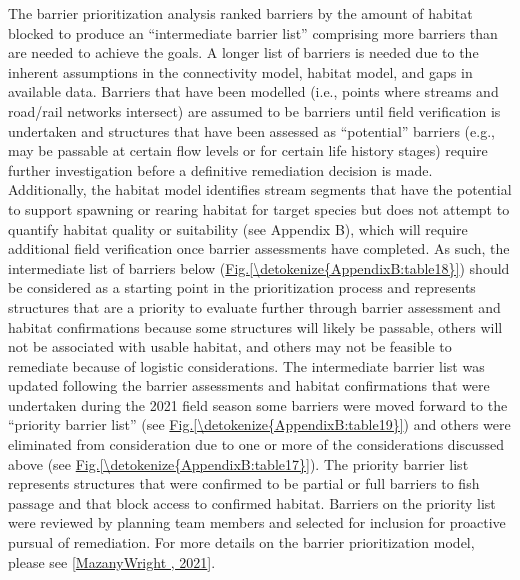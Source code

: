 \documentclass[letterpaper,10pt,english]{jupyterBook}
\begin{document}
\sphinxAtStartPar
The barrier prioritization analysis ranked barriers by the amount of habitat blocked to produce an “intermediate barrier list” comprising more barriers than are needed to achieve the goals. A longer list of barriers is needed due to the inherent assumptions in the connectivity model, habitat model, and gaps in available data. Barriers that have been modelled (i.e., points where streams and road/rail networks intersect) are assumed to be barriers until field verification is undertaken and structures that have been assessed as “potential” barriers (e.g., may be passable at certain flow levels or for certain life history stages) require further investigation before a definitive remediation decision is made. Additionally, the habitat model identifies stream segments that have the potential to support spawning or rearing habitat for target species but does not attempt to quantify habitat quality or suitability (see Appendix B), which will require additional field verification once barrier assessments have completed. As such, the intermediate list of barriers below (\hyperref[\detokenize{AppendixB:table18}]{Fig.\@ \ref{\detokenize{AppendixB:table18}}}) should be considered as a starting point in the prioritization process and represents structures that are a priority to evaluate further through barrier assessment and habitat confirmations because some structures will likely be passable, others will not be associated with usable habitat, and others may not be feasible to remediate because of logistic considerations. The intermediate barrier list was updated following the barrier assessments and habitat confirmations that were undertaken during the 2021 field season \sphinxhyphen{} some barriers were moved forward to the “priority barrier list” (see \hyperref[\detokenize{AppendixB:table19}]{Fig.\@ \ref{\detokenize{AppendixB:table19}}}) and others were eliminated from consideration due to one or more of the considerations discussed above (see \hyperref[\detokenize{AppendixB:table17}]{Fig.\@ \ref{\detokenize{AppendixB:table17}}}). The priority barrier list represents structures that were confirmed to be partial or full barriers to fish passage and that block access to confirmed habitat. Barriers on the priority list were reviewed by planning team members and selected for inclusion for proactive pursual of remediation.  For more details on the barrier prioritization model, please see {[}\hyperlink{cite.references:id12}{Mazany\sphinxhyphen{}Wright , 2021}{]}.
\end{document}
